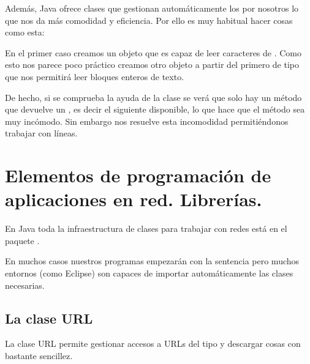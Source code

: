 \documentclass[letterpaper,10pt,spanish]{sphinxmanual}
\begin{document}
Además, Java ofrece clases que gestionan automáticamente los  por nosotros lo que nos da más comodidad y eficiencia. Por ello es muy habitual hacer cosas como esta:

%
\begin{sphinxVerbatim}[commandchars=\\\{\}]
  
         
  
         
\end{sphinxVerbatim}

En el primer caso creamos un objeto  que es capaz de leer caracteres de . Como esto nos parece poco práctico creamos otro objeto a partir del primero de tipo  que nos permitirá leer bloques enteros de texto.

De hecho, si se comprueba la ayuda de la clase  se verá que solo hay un método  que devuelve un , es decir el siguiente  disponible, lo que hace que el método sea muy incómodo. Sin embargo  nos resuelve esta incomodidad permitiéndonos trabajar con líneas.


\section{Elementos de programación de aplicaciones en red. Librerías.}
\label{\detokenize{textos/tema3:elementos-de-programacion-de-aplicaciones-en-red-librerias}}
En Java toda la infraestructura de clases para trabajar con redes está en el paquete .

En muchos casos nuestros programas empezarán con la sentencia  pero muchos entornos (como Eclipse) son capaces de importar automáticamente las clases necesarias.


\subsection{La clase URL}
\label{\detokenize{textos/tema3:la-clase-url}}
La clase URL permite gestionar accesos a URLs del tipo  y descargar cosas con bastante sencillez.
\end{document}

